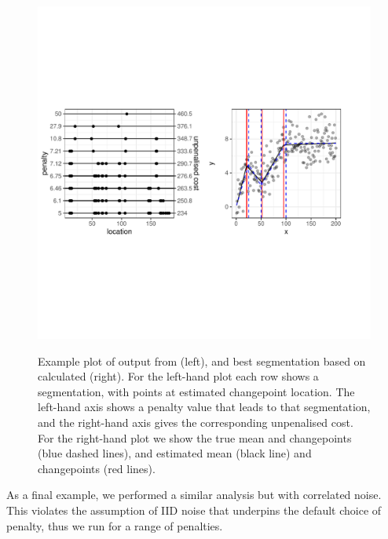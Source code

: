 \documentclass[article]{jss}
\begin{document}
%
%
\begin{figure}
\centering
{\includegraphics[scale=.5,width=15cm,trim={0 4.4cm 0 4.4cm},clip]{figures/cpop_crops_example_ggplot.pdf}}
\caption{Example plot of output from 
(left), and best segmentation based on calculated  (right). For the left-hand plot each row shows a segmentation, with points at estimated changepoint location. The left-hand axis shows a penalty value that leads to that segmentation, and the right-hand axis gives the corresponding unpenalised cost. For the right-hand plot we show the true mean and changepoints (blue dashed lines), and estimated mean (black line) and changepoints (red lines).}
\label{fig:crops.cpopA}
\end{figure}
%
%
As a final example, we performed a similar analysis but with correlated noise. This violates the assumption of IID noise that underpins the default choice of penalty, thus we run  for a range of penalties. 
\end{document}
